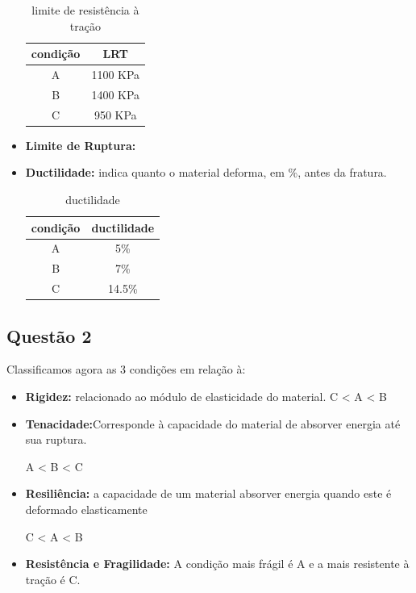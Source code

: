 \documentclass[journal]{IEEEtran}
\begin{document}
\begin{itemize}
   \begin{table}[!htp]
  \centering
  \begin{tabular}{|c|c|} \hline
  condição & LRT \\ \hline
  A & 1100 KPa   \\ \hline
  B & 1400 KPa\\ \hline
  C & 950 KPa\\ \hline
  \end{tabular}
  \caption{limite de resistência à tração}
 \end{table}

    \item \textbf{Limite de Ruptura: } 

    \item \textbf{Ductilidade: }
    indica quanto o material deforma, em \%, antes da 
    fratura.
    
       \begin{table}[!htp]
  \centering
  \begin{tabular}{|c|c|} \hline
  condição & ductilidade \\ \hline
  A & 5\%   \\ \hline
  B & 7\% \\ \hline
  C & 14.5\% \\ \hline
  \end{tabular}
  \caption{ductilidade}
 \end{table}
    
\end{itemize}

\subsection*{Questão 2}
Classificamos agora as 3 condições em relação à:
\begin{itemize}
 \item \textbf{Rigidez:} relacionado ao módulo de elasticidade
 do material.
 C < A < B

 \item \textbf{Tenacidade:}Corresponde à capacidade do material de 
absorver energia até sua ruptura.

  A < B < C
 
 \item \textbf{Resiliência:} a capacidade de um material absorver 
energia quando este é deformado elasticamente

 C < A < B
 
 \item \textbf{Resistência e Fragilidade:}
  A condição mais frágil é A e a mais resistente à tração é C.
\end{itemize}
\end{document}
